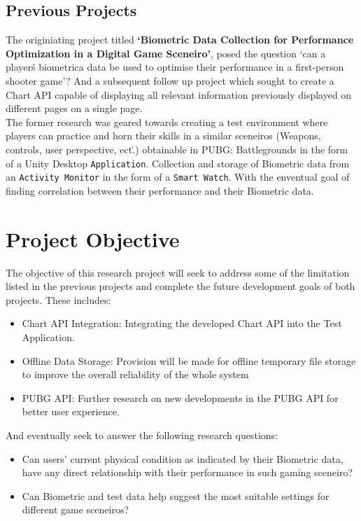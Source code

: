 \documentclass{report}
\begin{document}
    \subsection*{Previous Projects}
    The originiating project titled \textbf{`Biometric Data Collection for Performance Optimization in a Digital
    Game Sceneiro'}, posed the question `can a player\'s biometrica data be used to optimise their performance in a 
    first-person shooter game'? And a subsequent follow up project which sought to create a Chart API capable of displaying 
    all relevant information previously displayed on different pages on a single page.\\
    The former research was geared towards creating a test environment where players can 
    practice and horn their skills in a similar sceneiros (Weapons, controls, user perspective, ect\..) obtainable in PUBG\:: 
    Battlegrounds in the form of a Unity Desktop {\tt Application}. Collection and storage of Biometric data from an 
    {\tt Activity Monitor} in the form of a {\tt Smart Watch}. With the enventual goal of finding correlation between their
    performance and their Biometric data. 
    \\

    
    \section*{Project Objective}
        The objective of this research project will seek to address some of the limitation listed in the previous projects and
        complete the future development goals of both projects. 
        These includes\::
        \begin{itemize}
            \item{Chart API Integration}: Integrating the developed Chart API into the Test Application.
            \item {Offline Data Storage}: Provision will be made for offline temporary file storage to improve the overall 
            reliability of the whole system
            \item{PUBG API}: Further research on new developments in the PUBG API for better user experience. 
        \end{itemize} 
        
        And eventually seek to answer the following research questions\::

        \begin{itemize}
            \item {Can users' current physical condition as indicated by their Biometric data, have any direct relationship with 
            their performance in such gaming sceneiro?}
            \item {Can Biometric and test data help suggest the most suitable settings for different game sceneiros?}
        \end{itemize}
\end{document}
